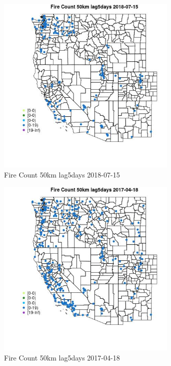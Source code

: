 \begin{figure} 
\centering  
\includegraphics[width=0.77\textwidth]{Code_Outputs/Report_ML_input_PM25_Step4_part_e_de_duplicated_aves_compiled_2019-05-20wNAs_MapObsFire_Count_50km_lag5days2018-07-15.jpg} 
\caption{\label{fig:Report_ML_input_PM25_Step4_part_e_de_duplicated_aves_compiled_2019-05-20wNAsMapObsFire_Count_50km_lag5days2018-07-15}Fire Count 50km lag5days 2018-07-15} 
\end{figure} 
 

\begin{figure} 
\centering  
\includegraphics[width=0.77\textwidth]{Code_Outputs/Report_ML_input_PM25_Step4_part_e_de_duplicated_aves_compiled_2019-05-20wNAs_MapObsFire_Count_50km_lag5days2017-04-18.jpg} 
\caption{\label{fig:Report_ML_input_PM25_Step4_part_e_de_duplicated_aves_compiled_2019-05-20wNAsMapObsFire_Count_50km_lag5days2017-04-18}Fire Count 50km lag5days 2017-04-18} 
\end{figure} 
 

